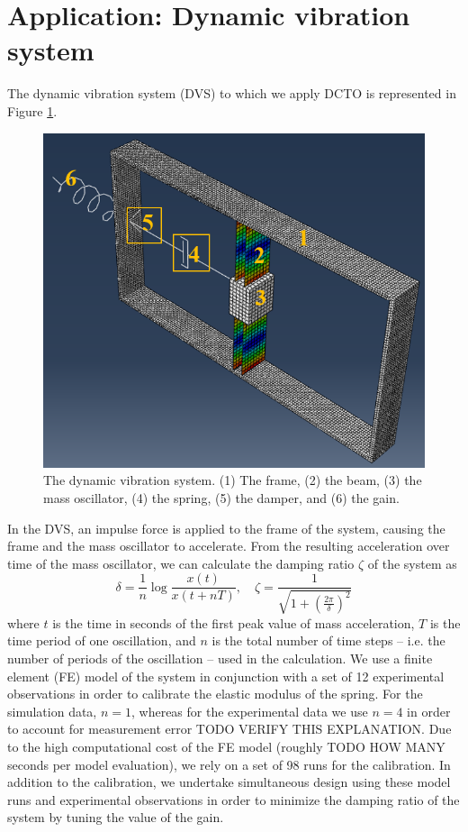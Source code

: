 \documentclass[12pt]{article}
\begin{document}
%
\section{Application: Dynamic vibration system}\label{sec:dvs}
%
The dynamic vibration system (DVS) to which we apply DCTO is represented in Figure \ref{fig:dvs}.
%
\begin{figure}
	\centering
	\includegraphics[scale=0.85]{FIG_dvs_illustration}
	\captionsetup{width=.85\linewidth}
	\caption{The dynamic vibration system. (1) The frame, (2) the beam, (3) the mass oscillator, (4) the spring, (5) the damper, and (6) the gain.}
	\label{fig:dvs}
\end{figure}
%
In the DVS, an impulse force is applied to the frame of the system, causing the frame and the mass oscillator to accelerate.
%
From the resulting acceleration over time of the mass oscillator, we can calculate the damping ratio $\zeta$ of the system as
\[
\delta = \frac1n \log\frac{x(t)}{x(t+nT)},\quad \zeta = \frac1{\sqrt{1+\left(\frac{2\pi}{\delta}\right)^2}}
\]
%
where $t$ is the time in seconds of the first peak value of mass acceleration, $T$ is the time period of one oscillation, and $n$ is the total number of time steps -- i.e. the number of periods of the oscillation -- used in the calculation.
%
We use a finite element (FE) model of the system in conjunction with a set of 12 experimental observations in order to calibrate the elastic modulus of the spring.
%
For the simulation data, $n=1$, whereas for the experimental data we use $n=4$ in order to account for measurement error TODO VERIFY THIS EXPLANATION.
%
Due to the high computational cost of the FE model (roughly TODO HOW MANY seconds per model evaluation), we rely on a set of 98 runs for the calibration.
%
In addition to the calibration, we undertake simultaneous design using these model runs and experimental observations in order to minimize the damping ratio of the system by tuning the value of the gain.
%
\end{document}
